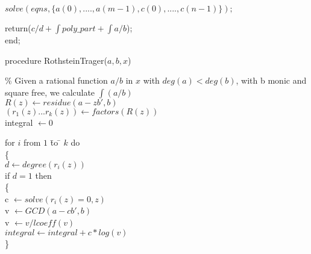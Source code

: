 $solve(eqns,\{a(0),....,a(m-1),c(0),....,c(n-1)\});$

return($c/d+\int poly\_part + \int a/b$);
\\
end;

procedure RothsteinTrager($a,b,x$)

\% Given a rational function $a/b$ in $x$ with $deg(a)<deg(b)$, with b monic and square free, we calculate $ \int(a/b)$ \\
$R(z) \leftarrow residue(a-zb',b)$ \\
$(r_{1}(z)...r_{k}(z)) \leftarrow factors(R(z))$ \\
integral $\leftarrow 0 $
\vspace*{\baselineskip}
\begin{tabbing}
for $i$ from $1$ \= to \= $k$  do   \\
\> \{ \\
\> \> $ d  \leftarrow degree(r_{i}(z))$ \\
\> \> if $d=1$ then \= \\
\> \> \> \{ \\
\> \> \> c $\leftarrow solve(r_{i}(z)=0,z)$ \\
\> \> \> v $\leftarrow GCD(a-cb',b)$\\
\> \> \> v $\leftarrow v/lcoeff(v) $\\

\> \> \> $integral \leftarrow integral+c*log(v)$ \\
\> \> \> \}\\


\end{tabbing}
